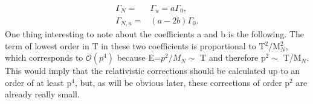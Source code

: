 \begin{align}
	\Gamma_N=&\Gamma_u=a\Gamma_0,\\
	\Gamma_{N,u}=&(a-2b)\Gamma_0.
\end{align}
One thing interesting to note about the coefficients a and b is the following. The term of lowest order in T in these two coefficients is proportional to T$^2$/M$_N^2$, which corresponds to $\mathcal{O}(p^4)$ because E=$p^2/M_N\sim$ T and therefore p$^2\sim$ T/M$_N$. This would imply that the relativistic corrections should be calculated up to an order of at least p$^4$, but, as will be obvious later, these corrections of order p$^2$ are already really small.
